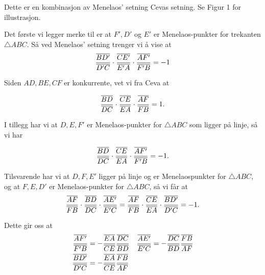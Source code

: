 \documentclass[11pt, norsk]{article}
\begin{document}
\begin{losn}
Dette er en kombinasjon av Menelaos' setning Cevas setning. Se Figur 1 for illustrasjon.

Det første vi legger merke til er at $F',D'$ og $E'$ er Menelaos-punkter for trekanten $\triangle ABC$. Så ved Menelaos' setning trenger vi å vise at
$$
\frac{\overline{BD'}}{\overline{D'C}} \cdot
\frac{\overline{CE'}}{\overline{E'A}} \cdot
\frac{\overline{AF'}}{\overline{F'B}} = -1
$$
  
Siden $AD,BE,CF$ er konkurrente, vet vi fra Ceva at

$$
\frac{\overline{BD}}{\overline{DC}} \cdot
\frac{\overline{CE}}{\overline{EA}} \cdot
\frac{\overline{AF}}{\overline{FB}} = 1.
$$

I tillegg har vi at $D,E,F'$ er Menelaos-punkter for $\triangle ABC$ som ligger på linje, så vi har

$$
\frac{\overline{BD}}{\overline{DC}} \cdot
\frac{\overline{CE}}{\overline{EA}} \cdot
\frac{\overline{AF'}}{\overline{F'B}} = -1.
$$

Tilsvarende har vi at $D,F,E'$ ligger på linje og er Menelaospunkter for $\triangle ABC$, og at $F,E,D'$ er Menelaos-punkter for $\triangle ABC$, så vi får at
$$
\frac{\overline{AF}}{\overline{FB}} \cdot
\frac{\overline{BD}}{\overline{DC}} \cdot
\frac{\overline{AE'}}{\overline{E'C}} = 
\frac{\overline{AF}}{\overline{FB}} \cdot
\frac{\overline{CE}}{\overline{EA}} \cdot
\frac{\overline{BD'}}{\overline{D'C}} = -1.
$$

Dette gir oss at
\begin{align*}
\frac{\overline{AF'}}{\overline{F'B}} &= - \frac{\overline{EA}}{\overline{CE}}\frac{\overline{DC}}{\overline{BD}} &
\frac{\overline{AE'}}{\overline{E'C}} &= - \frac{\overline{DC}}{\overline{BD}}\frac{\overline{FB}}{\overline{AF}}  \\
\frac{\overline{BD'}}{\overline{D'C}} &= - \frac{\overline{EA}}{\overline{CE}}\frac{\overline{FB}}{\overline{AF}} 
\end{align*}


\end{losn}
\end{document}
